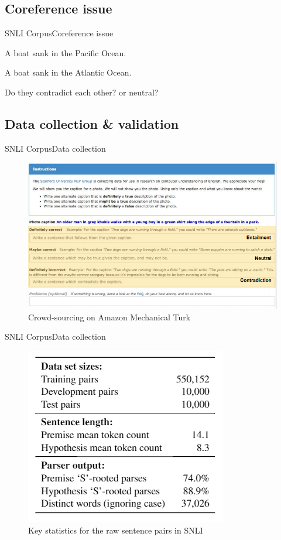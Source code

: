 \documentclass{beamer}
\begin{document}
\subsection{Coreference issue}

\begin{frame}{SNLI Corpus}{Coreference issue}
    \begin{example}
        \alert<2>{A boat} sank in the Pacific Ocean.
        
        \alert<2>{A boat} sank in the Atlantic Ocean.
    \end{example}
    Do they contradict each other? or neutral?
\end{frame}

\subsection{Data collection \& validation}

\begin{frame}{SNLI Corpus}{Data collection}
  \begin{figure}[h]
    \centering
    \includegraphics[scale=0.5]{data_collecting}
    \caption{Crowd-sourcing on Amazon Mechanical Turk\footnotemark}
  \end{figure}
\end{frame}

\begin{frame}{SNLI Corpus}{Data collection}
  \begin{figure}[h]
    \centering
    \includegraphics[scale=0.5]{data_collection}
    \caption{Key statistics for the raw sentence pairs in SNLI}
  \end{figure}
\end{frame}
\end{document}
